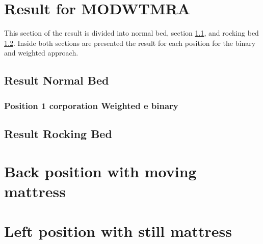 \clearpage
\section{Result for MODWTMRA} \label{cap:ResultMODWTRA}
This section of the result is divided into normal bed, section \ref{cap:ResultNormalBed1}, and rocking bed \ref{cap:ResultRockingBed1}. Inside both sections are presented the result for each position for the binary and weighted approach.
\subsection{Result Normal Bed}   \label{cap:ResultNormalBed1}



\subsubsection*{Position 1 corporation Weighted e binary}
\subsection{Result Rocking Bed}   \label{cap:ResultRockingBed1}


%



\section{Back position with moving mattress}


\section{Left position with still mattress}









